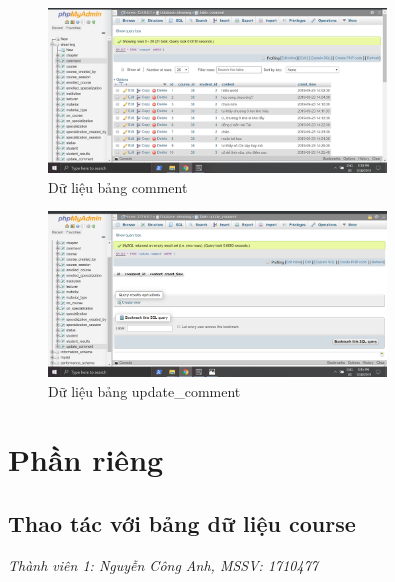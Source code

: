 \documentclass[12pt,a4paper,titlepage]{article}
\begin{document}
\newpage
\begin{figure}[h!]
	\centering
	\caption{Dữ liệu bảng comment}
	\includegraphics[width=0.8\textwidth]{images/dat3.png}
\end{figure}
\begin{figure}[h!]
	\centering
	\caption{Dữ liệu bảng update_comment}
	\includegraphics[width=0.8\textwidth]{images/dat20.png}
\end{figure}
\newpage
\section{Phần riêng}
\subsection{Thao tác với bảng dữ liệu course}
\textit{Thành viên 1: Nguyễn Công Anh, MSSV: 1710477}
\end{document}
